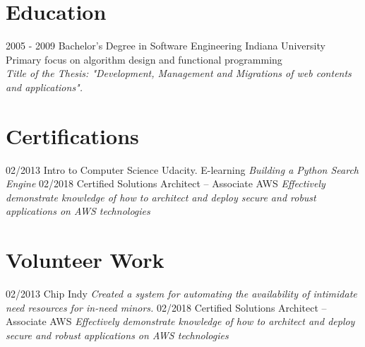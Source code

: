 \documentclass[]{friggeri-cv}
\begin{document}
\section{Education}
\begin{entrylist}
  \entry
    {2005 - 2009}
    {Bachelor's Degree in Software Engineering}
    {Indiana University}
    {Primary focus on algorithm design and functional programming \\
    \emph{Title of the Thesis: "Development, Management and Migrations of web contents and applications".}\\
    }
\end{entrylist}

\section{Certifications}
\begin{entrylist}
  \entry
    {02/2013}
    {Intro to Computer Science}
    {Udacity. E-learning}
    {\emph{Building a Python Search Engine}}
     \entry
    {02/2018}
    {Certified Solutions Architect – Associate }
    {AWS}
    {\emph{Effectively demonstrate knowledge of how to architect and deploy secure and robust applications on AWS technologies}}
\end{entrylist}
\section{Volunteer Work}
\begin{entrylist}
	\entry
	{02/2013}
	{Chip Indy}
	{}
	{\emph{Created a system for automating the availability of intimidate need resources for in-need minors.}}
	\entry
	{02/2018}
	{Certified Solutions Architect – Associate }
	{AWS}
	{\emph{Effectively demonstrate knowledge of how to architect and deploy secure and robust applications on AWS technologies}}
\end{entrylist}
\end{document}
